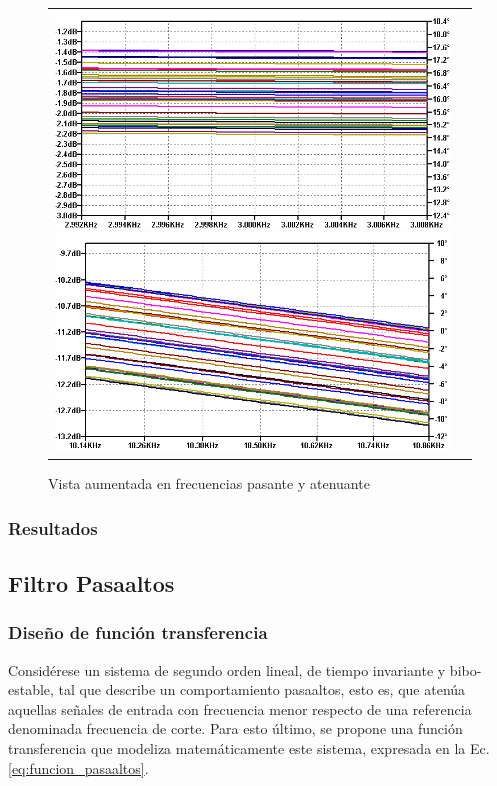 \begin{figure}[H]
    \centering
    \begin{tabular}{c c}
        \includegraphics[scale=0.4]{../EJ2/Recursos/lp_montecarlo_fp.png}
        \includegraphics[scale=0.4]{../EJ2/Recursos/lp_montecarlo_fa.png}
    \end{tabular}
    \caption{Vista aumentada en frecuencias pasante y atenuante}
    \label{fig:lp_montecarlo_frecuencias}
\end{figure}

\subsubsection{Resultados}

\subsection{Filtro Pasaaltos}

\subsubsection{Dise\~no de funci\'on transferencia}
Consid\'erese un sistema de segundo orden lineal, de tiempo invariante y bibo-estable, tal que describe un comportamiento
pasaaltos, esto es, que aten\'ua aquellas se\~nales de entrada con frecuencia menor respecto de una referencia denominada frecuencia de corte.
Para esto \'ultimo, se propone una funci\'on transferencia que modeliza matem\'aticamente este sistema, expresada en la Ec. \ref{eq:funcion_pasaaltos}.

